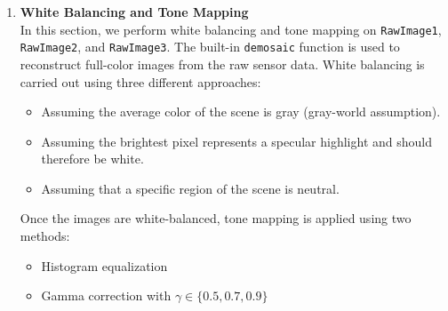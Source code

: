 \documentclass[11pt, a4]{article}
\begin{document}
\begin{enumerate}
\begin{enumerate}
		\end{enumerate}
		\item \textbf{White Balancing and Tone Mapping}\\
		In this section, we perform white balancing and tone mapping on \texttt{RawImage1}, \texttt{RawImage2}, and \texttt{RawImage3}. The built-in \texttt{demosaic} function is used to reconstruct full-color images from the raw sensor data. White balancing is carried out using three different approaches:  
		\begin{itemize}
			\item Assuming the average color of the scene is gray (gray-world assumption). 
			\item Assuming the brightest pixel represents a specular highlight and should therefore be white. 
			\item Assuming that a specific region of the scene is neutral. 
		\end{itemize}
		
		Once the images are white-balanced, tone mapping is applied using two methods:  
		\begin{itemize}
			\item Histogram equalization  
			\item Gamma correction with $\gamma \in \{0.5, 0.7, 0.9\}$  
		\end{itemize}
		

\end{enumerate}
\end{document}
